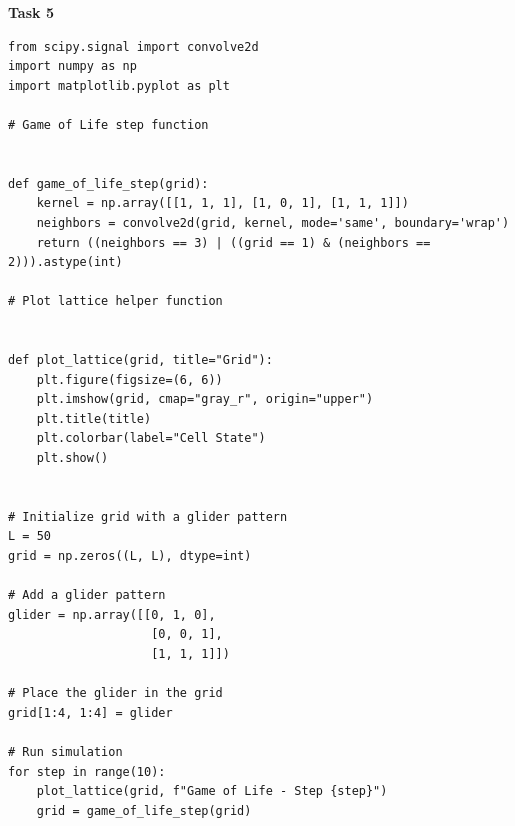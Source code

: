 \documentclass[10pt,letterpaper, onecolumn]{report}
\begin{document}
\begin{flushleft}
    \begin{flushleft}
        \textbf{Task 5}
        \hfill\break
        \setlength{\parindent}{1.5em} %
        \setlength{\parskip}{0.5em}   %


        \begin{lstlisting}[style=myPythonStyle, caption={Game of Life}]
from scipy.signal import convolve2d
import numpy as np
import matplotlib.pyplot as plt

# Game of Life step function


def game_of_life_step(grid):
    kernel = np.array([[1, 1, 1], [1, 0, 1], [1, 1, 1]])
    neighbors = convolve2d(grid, kernel, mode='same', boundary='wrap')
    return ((neighbors == 3) | ((grid == 1) & (neighbors == 2))).astype(int)

# Plot lattice helper function


def plot_lattice(grid, title="Grid"):
    plt.figure(figsize=(6, 6))
    plt.imshow(grid, cmap="gray_r", origin="upper")
    plt.title(title)
    plt.colorbar(label="Cell State")
    plt.show()


# Initialize grid with a glider pattern
L = 50
grid = np.zeros((L, L), dtype=int)

# Add a glider pattern
glider = np.array([[0, 1, 0],
                    [0, 0, 1],
                    [1, 1, 1]])

# Place the glider in the grid
grid[1:4, 1:4] = glider

# Run simulation
for step in range(10):
    plot_lattice(grid, f"Game of Life - Step {step}")
    grid = game_of_life_step(grid)
                    
                    \end{lstlisting}


\end{flushleft}
\end{flushleft}
\end{document}
